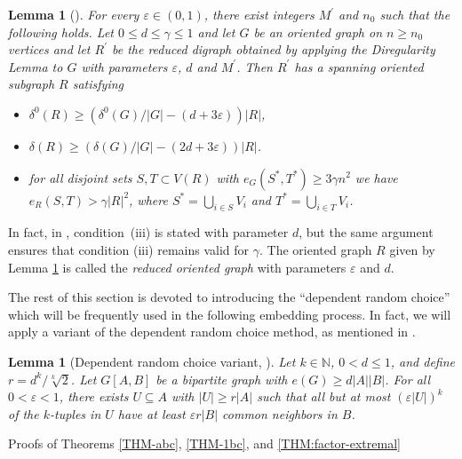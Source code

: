 \documentclass[11pt,a4paper,reqno]{amsart}
\makeatletter
\renewcommand\section{\@startsection{section}{1}%
  \z@{-1.0\linespacing\@plus-.7\linespacing}{1\linespacing}%
  {\normalfont\bfseries\large\centering}}
\newtheorem{lemma}[theorem]{Lemma}
\theoremstyle{definition} %
\makeatother
\begin{document}
\begin{lemma}[\cite{keevashJLMS79, kellyCPC17}]\label{LEM-reducedori}
For every $\varepsilon \in (0,1)$, there exist integers $M^{\prime}$ and $n_0$
such that the following holds. Let $0\leqslant d\leqslant \gamma \leqslant 1$ and let $G$ be an   oriented graph on $n\geqslant n_0$ vertices and let $R^{\prime}$ be the reduced digraph 
obtained by applying the Diregularity Lemma to $G$ with parameters $\varepsilon$, $d$ and $M^{\prime}$.
Then $R^{\prime}$ has a spanning oriented subgraph $R$ satisfying 
\begin{itemize}
\item[\rm{(i)}]$\delta^0(R)\geqslant  (\delta^0(G)/|G|-(d+3\varepsilon))|R|$,
\item[\rm{(ii)}] $\delta(R)\geqslant (\delta(G)/|G|-(2d+3\varepsilon))|R|$.
\item [\rm{(iii)}] for all disjoint sets $S,T\subset V(R)$ with $e_G(S^\ast,T^\ast)\geqslant 3\gamma n^2$ we have $e_R(S,T)>\gamma|R|^2$, where $S^\ast= \bigcup_{i\in S}V_i$ and $T^\ast = \bigcup _{i\in T} V_i$.
\end{itemize}
\end{lemma}

 
 In fact, in \cite{keevashJLMS79}, condition~(iii) is stated with parameter $d$, but the same argument ensures that condition (iii) remains valid for $\gamma$. The oriented graph $R$ given by Lemma \ref{LEM-reducedori} is called the \emph{reduced oriented graph} with parameters $\varepsilon$ and $d$.


The rest of this section is devoted to introducing the ``dependent random choice'' which will be frequently used in the following embedding process.
In fact, we will apply a 
variant of the dependent random choice method, as mentioned in \cite{debiasioCPC35}.
    
\begin{lemma}[Dependent random choice variant, \cite{debiasioCPC35}]\label{LEM:dependentrandom} 
    Let $k\in \mathbb{N}$, $0<d\leqslant 1$, and define $r=d^k/\sqrt[k]{2}$.  Let $G[A,B]$ be a bipartite graph with $e(G) \geqslant d|A||B|$. For all $0 < \varepsilon < 1$, there exists $U \subseteq A$ with $|U| \geqslant r|A|$ such that all but at most $(\varepsilon|U|)^k$ of the $k$-tuples in $U$ have at least $\varepsilon r |B|$ common neighbors in $B$.
 \end{lemma}




\section{Proofs of Theorems \ref{THM-abc}, \ref{THM-1bc}, and \ref{THM:factor-extremal}}\label{SEC-main results}
\end{document}
